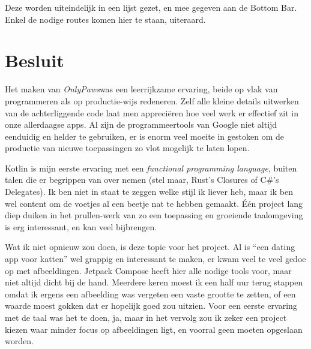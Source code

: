 \documentclass{report}
\begin{document}
Deze worden uiteindelijk in een lijst gezet, en mee gegeven aan de Bottom Bar.
Enkel de nodige routes komen hier te staan, uiteraard.


\chapter{Besluit}
Het maken van \textit{OnlyPaws}\texttrademark  was een leerrijkzame ervaring,
beide op vlak van programmeren als op productie-wijs redeneren.
Zelf alle kleine details uitwerken van de achterliggende code laat men appreciëren hoe veel werk er effectief zit in onze allerdaagse apps.
Al zijn de programmeertools van Google niet altijd eenduidig en helder te gebruiken, er is enorm veel moeite in gestoken om de productie van nieuwe toepassingen zo vlot mogelijk te laten lopen.

Kotlin is mijn eerste ervaring met een \textit{functional programming language}, buiten talen die er begrippen van over nemen (stel maar, Rust's Closures of C\#'s Delegates).
Ik ben niet in staat te zeggen welke stijl ik liever heb, maar ik ben wel content om de voetjes al een beetje nat te hebben gemaakt.
Één project lang diep duiken in het prullen-werk van zo een toepassing en groeiende taalomgeving is erg interessant, en kan veel bijbrengen. 

Wat ik niet opnieuw zou doen, is deze topic voor het project.
Al is ``een dating app voor katten'' wel grappig en interessant te maken, er kwam veel te veel gedoe op met afbeeldingen.
Jetpack Compose heeft hier alle nodige tools voor, maar niet altijd dicht bij de hand.
Meerdere keren moest ik een half uur terug stappen omdat ik ergens een afbeelding was vergeten een vaste grootte te zetten, of een waarde moest gokken dat er hopelijk goed zou uitzien.
Voor een eerste ervaring met de taal was het te doen, ja, maar in het vervolg zou ik zeker een project kiezen waar minder focus op afbeeldingen ligt, en voorral geen moeten opgeslaan worden.
\end{document}
